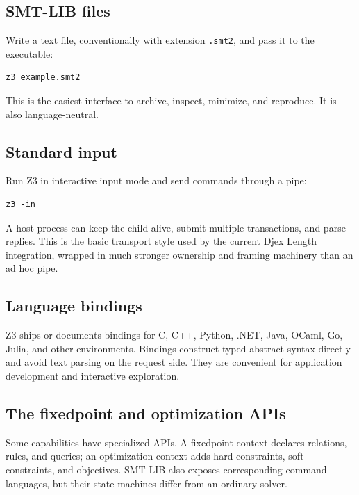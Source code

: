 \documentclass[10pt,letterpaper,oneside]{report}
\newcommand{\filepath}[1]{\nolinkurl{#1}}
\begin{document}
\subsection{SMT-LIB files}

Write a text file, conventionally with extension \filepath{.smt2}, and pass it to the executable:

\begin{lstlisting}[language=ShellX]
z3 example.smt2
\end{lstlisting}

This is the easiest interface to archive, inspect, minimize, and reproduce. It is also language-neutral.

\subsection{Standard input}

Run Z3 in interactive input mode and send commands through a pipe:

\begin{lstlisting}[language=ShellX]
z3 -in
\end{lstlisting}

A host process can keep the child alive, submit multiple transactions, and parse replies. This is the basic transport style used by the current Djex Length integration, wrapped in much stronger ownership and framing machinery than an ad hoc pipe.

\subsection{Language bindings}

Z3 ships or documents bindings for C, C++, Python, .NET, Java, OCaml, Go, Julia, and other environments. Bindings construct typed abstract syntax directly and avoid text parsing on the request side. They are convenient for application development and interactive exploration.

\subsection{The fixedpoint and optimization APIs}

Some capabilities have specialized APIs. A fixedpoint context declares relations, rules, and queries; an optimization context adds hard constraints, soft constraints, and objectives. SMT-LIB also exposes corresponding command languages, but their state machines differ from an ordinary solver.
\end{document}
